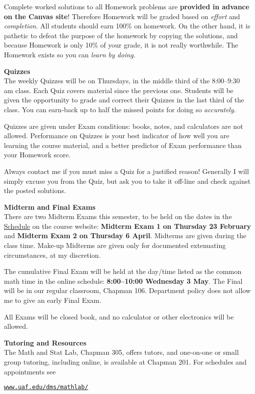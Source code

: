 \documentclass[12pt]{article}
\renewcommand{\emph}[1]{\textsf{\textbf{#1}}}
\newcommand{\localhead}[1]{\par\smallskip\textbf{#1} \smallskip\nobreak\\}%
\def\heading#1{\localhead{\large\emph{#1}}}
\begin{document}
Complete worked solutions to all Homework problems are \emph{provided in advance on the Canvas site}!  Therefore Homework will be graded based on \textsl{effort} and \textsl{completion}.  All students should earn 100\% on homework.  On the other hand, it is pathetic to defeat the purpose of the homework by copying the solutions, and because Homework is only 10\% of your grade, it is not really worthwhile.  The Homework exists so you can \textsl{learn by doing}.


\heading{Quizzes}
The weekly Quizzes will be on Thursdays, in the middle third of the 8:00--9:30 am class.  Each Quiz covers material since the previous one.  Students will be given the opportunity to grade and correct their Quizzes in the last third of the class.  You can earn-back up to half the missed points for doing so \textsl{accurately}.

Quizzes are given under Exam conditions: books, notes, and calculators are not allowed.  Performance on Quizzes is your best indicator of how well you are learning the course material, and a better predictor of Exam performance than your Homework score.

Always contact me if you must miss a Quiz for a justified reason!  Generally I will simply excuse you from the Quiz, but ask you to take it off-line and check against the posted solutions.


\heading{Midterm and Final Exams}
There are two Midterm Exams this semester, to be held on the dates in the \href{https://bueler.github.io/calc3/assets/general/schedule.pdf}{Schedule} on the course website: \emph{Midterm Exam 1 on Thursday 23 February} and \emph{Midterm Exam 2 on Thursday 6 April}.  Midterms are given during the class time.  Make-up Midterms are given only for documented extenuating circumstances, at my discretion.

The cumulative Final Exam will be held at the day/time listed as the common math time in the online schedule: \emph{8:00--10:00 Wednesday 3 May}.  The Final will be in our regular classroom, Chapman 106.  Department policy does not allow me to give an early Final Exam.

All Exams will be closed book, and no calculator or other electronics will be allowed.


\heading{Tutoring and Resources}
The Math and Stat Lab, Chapman 305, offers tutors, and one-on-one or small group tutoring, including online, is available at Chapman 201.  For schedules and appointments see

\centerline{\href{http://www.uaf.edu/dms/mathlab/}{\texttt{www.uaf.edu/dms/mathlab/}}}
\end{document}
